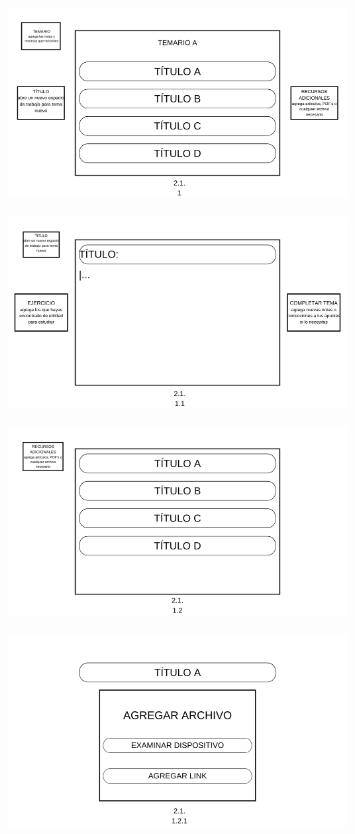 \documentclass{report}
\begin{document}
\begin{figure}[H]
    \centering
    \includegraphics[width=0.8\textwidth]{./Diagramas/6.png}
\end{figure}

\begin{figure}[H]
    \centering
    \includegraphics[width=0.8\textwidth]{./Diagramas/7.png}
\end{figure}

\begin{figure}[H]
    \centering
    \includegraphics[width=0.8\textwidth]{./Diagramas/8.png}
\end{figure}

\begin{figure}[H]
    \centering
    \includegraphics[width=0.8\textwidth]{./Diagramas/9.png}
\end{figure}
\end{document}
